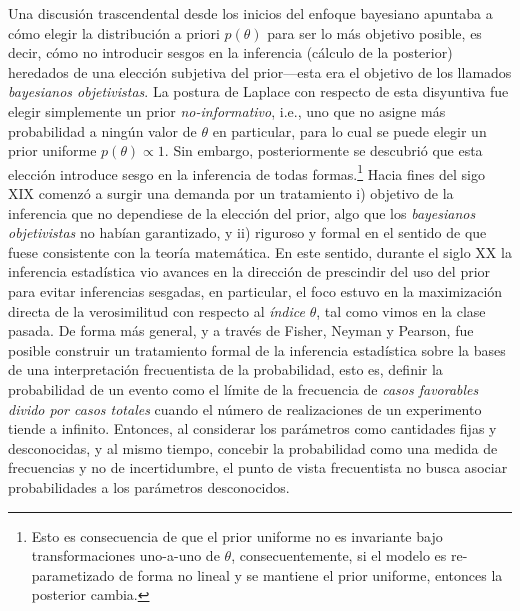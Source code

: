 Una discusión trascendental desde los inicios del enfoque bayesiano apuntaba a  cómo elegir la distribución a  priori $p(\theta)$ para ser lo más objetivo posible, es decir, cómo no introducir sesgos en la inferencia (cálculo de la posterior) heredados de una elección subjetiva del prior---esta era el objetivo de los llamados \emph{bayesianos objetivistas}. La postura de Laplace con respecto de esta disyuntiva fue elegir simplemente un prior \emph{no-informativo}, i.e., uno que no asigne más probabilidad a ningún valor de $\theta$ en particular, para lo cual se puede elegir un prior uniforme $p(\theta)\propto 1$. Sin embargo, posteriormente se descubrió que esta elección introduce sesgo en la inferencia de todas formas.\footnote{Esto es consecuencia de que el prior uniforme no es invariante bajo transformaciones uno-a-uno de $\theta$, consecuentemente, si el modelo es re-parametizado de forma no lineal y se mantiene el prior uniforme, entonces la posterior cambia.} Hacia fines del sigo XIX comenzó a surgir una demanda por un tratamiento i) objetivo de la inferencia que no dependiese de la elección del prior, algo que los \emph{bayesianos objetivistas} no habían garantizado, y ii) riguroso y formal en el sentido de que fuese consistente con la teoría matemática. En este sentido, durante el siglo XX la inferencia estadística vio avances en la dirección de prescindir del uso del prior para evitar inferencias sesgadas, en particular, el foco estuvo en la maximización directa de la verosimilitud con respecto al \emph{índice} $\theta$, tal como vimos en la clase pasada. De forma más general, y a través de Fisher, Neyman y Pearson, fue posible construir un tratamiento formal de la inferencia estadística sobre la bases de una interpretación frecuentista de la probabilidad, esto es, definir la probabilidad de un evento como el límite de la frecuencia de \emph{casos favorables divido por casos totales} cuando el número de realizaciones de un experimento tiende a infinito. Entonces, al considerar los parámetros como cantidades fijas y desconocidas, y al mismo tiempo, concebir la probabilidad como una medida de frecuencias y no de incertidumbre, el punto de vista frecuentista no busca asociar probabilidades a los parámetros desconocidos.

